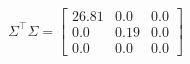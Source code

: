\documentclass[preview]{standalone}
\begin{document}
\begin{align*}
\Sigma^\top\Sigma=\left[\begin{matrix}26.81&0.0&0.0\\0.0&0.19&0.0\\0.0&0.0&0.0\end{matrix}\right]
\end{align*}
\end{document}
